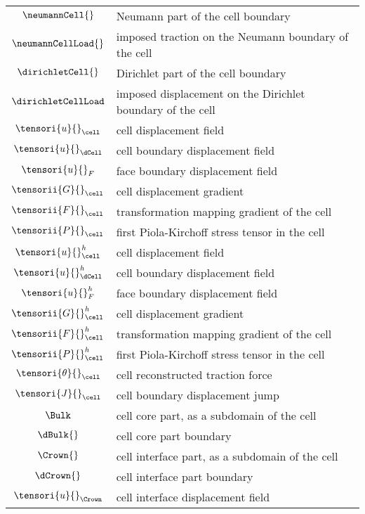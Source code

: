 \begin{longtable}{c l}
    \\
    $\neumannCell{}$ & Neumann part of the cell boundary
    \\
    $\neumannCellLoad{}$ & imposed traction on the Neumann boundary of the cell
    \\
    $\dirichletCell{}$ & Dirichlet part of the cell boundary
    \\
    $\dirichletCellLoad$ & imposed displacement on the Dirichlet boundary of the cell
    \\
    $\tensori{u}{}_{\cell}$ & cell displacement field
    \\
    $\tensori{u}{}_{\dCell}$ & cell boundary displacement field
    \\
    $\tensori{u}{}_{F}$ & face boundary displacement field
    \\
    $\tensorii{G}{}_{\cell}$ & cell displacement gradient
    \\
    $\tensorii{F}{}_{\cell}$ & transformation mapping gradient of the cell
    \\
    $\tensorii{P}{}_{\cell}$ & first Piola-Kirchoff stress tensor in the cell
    \\
    $\tensori{u}{}_{\cell}^h$ & cell displacement field
    \\
    $\tensori{u}{}_{\dCell}^h$ & cell boundary displacement field
    \\
    $\tensori{u}{}_{F}^h$ & face boundary displacement field
    \\
    $\tensorii{G}{}_{\cell}^h$ & cell displacement gradient
    \\
    $\tensorii{F}{}_{\cell}^h$ & transformation mapping gradient of the cell
    \\
    $\tensorii{P}{}_{\cell}^h$ & first Piola-Kirchoff stress tensor in the cell
    \\
    $\tensori{\theta}{}_{\cell}$ & cell reconstructed traction force
    \\
    $\tensori{J}{}_{\cell}$ & cell boundary displacement jump
    \\
    $\Bulk$ & cell core part, as a subdomain of the cell
    \\
    $\dBulk{}$ & cell core part boundary
    \\
    $\Crown{}$ & cell interface part, as a subdomain of the cell
    \\
    $\dCrown{}$ & cell interface part boundary
    \\
    $\tensori{u}{}_{\Crown}$ & cell interface displacement field
    \\

\end{longtable}
